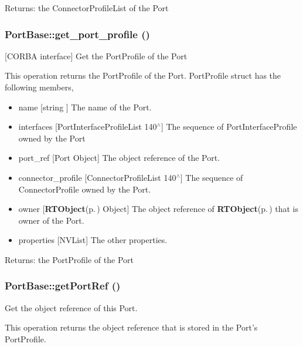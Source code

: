 \begin{Desc}
\item[Returns:]the Connector\-Profile\-List of the Port\end{Desc}
\subsubsection{\setlength{\rightskip}{0pt plus 5cm}Port\-Base::get\_\-port\_\-profile ()}\label{classPortBase_PortBasea2}


[CORBA interface] Get the Port\-Profile of the Port 

This operation returns the Port\-Profile of the Port. Port\-Profile struct has the following members,

\begin{itemize}
\item name [string ] The name of the Port.\item interfaces [Port\-Interface\-Profile\-List 140$^\wedge$] The sequence of Port\-Interface\-Profile owned by the Port\item port\_\-ref [Port Object] The object reference of the Port.\item connector\_\-profile [Connector\-Profile\-List 140$^\wedge$] The sequence of Connector\-Profile owned by the Port.\item owner [{\bf RTObject}{\rm (p.\,\pageref{namespaceRTObject})} Object] The object reference of {\bf RTObject}{\rm (p.\,\pageref{namespaceRTObject})} that is owner of the Port.\item properties [NVList] The other properties.\end{itemize}


\begin{Desc}
\item[Returns:]the Port\-Profile of the Port\end{Desc}
\subsubsection{\setlength{\rightskip}{0pt plus 5cm}Port\-Base::get\-Port\-Ref ()}\label{classPortBase_PortBasea13}


Get the object reference of this Port. 

This operation returns the object reference that is stored in the Port's Port\-Profile.


